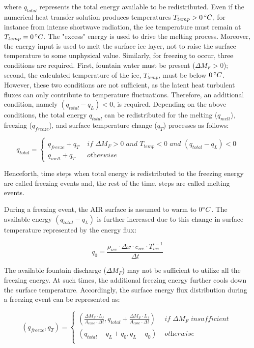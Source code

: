 where $q_{total}$ represents the total energy available to be redistributed. Even if the numerical heat transfer
solution produces temperatures $T_{temp}>0\, ^{\circ} C$, for instance from intense shortwave radiation, the ice
temperature must remain at $T_{temp} = 0\, ^{\circ} C$. The "excess" energy is used to drive the melting
process. Moreover, the energy input is used to melt the surface ice layer, not to raise the surface
temperature to some unphysical value. Similarly, for freezing to occur, three conditions are required. First,
fountain water must be present ($\Delta M_{F} > 0 $); second, the calculated temperature of the ice, $T_{temp}$,
must be below $0\, ^{\circ} C$. However, these two conditions are not sufficient, as the latent heat turbulent fluxes
can only contribute to temperature fluctuations. Therefore, an additional condition, namely $(q_{total}-q_{L})
	< 0$, is required. Depending on the above conditions, the total energy $q_{total}$ can be redistributed
for the melting ($q_{melt}$), freezing ($q_{freeze}$), and surface temperature change ($q_{T}$) processes as
follows:

\begin{equation}
	q_{total} = \left\{ \begin{array}{ll}
		q_{freeze} + q_{T} & \textit{ if } \Delta M_{F} > 0 \textit{ and } T_{temp} < 0 \textit{ and }(q_{total}-q_{L}) < 0 \\
		q_{melt} + q_{T}   & \textit{ otherwise}
	\end{array} \right.
\end{equation}

Henceforth, time steps when total energy is redistributed to the freezing energy are called freezing
events and, the rest of the time, steps are called melting events.


During a freezing event, the AIR surface is assumed to warm to $0 ^{\circ} C$. The available energy
$(q_{total}-q_{L})$ is further increased due to this change in surface temperature represented by the energy
flux:

$$q_{0} = \frac{\rho_{ice} \cdot \Delta x \cdot c_{ice} \cdot T_{ice}^{i-1}}{\Delta t}$$

The available fountain discharge ($\Delta M_{F}$) may not be sufficient to utilize all the freezing energy. At such times,
the additional freezing energy further cools down the surface temperature. Accordingly, the surface energy flux
distribution during a freezing event can be represented as:

\begin{equation}
	(q_{freeze}, q_{T}) = \left\{ \begin{array}{ll}
		(\frac{\Delta M_{F} \cdot L_f
		}{A_{cone} \cdot \Delta t}
		, q_{total}+\frac{\Delta M_{F} \cdot L_f
		}{A_{cone} \cdot \Delta t})          & \textit{ if  } \Delta M_{F} \textit{ insufficient } \\
		(q_{total}-q_{L}+q_{0}, q_{L}-q_{0}) & \textit{ otherwise }                                \\
	\end{array} \right.
\end{equation}


